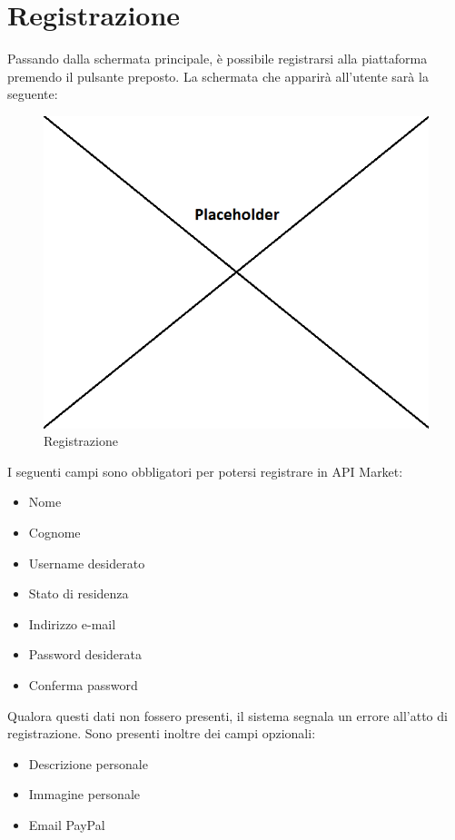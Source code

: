 \newpage
\section{Registrazione}

Passando dalla schermata principale, è possibile registrarsi alla piattaforma premendo il pulsante preposto. La schermata che apparirà all'utente sarà la seguente:

\label{Registrazione}
\begin{figure}[H]
	\centering
	\includegraphics[scale=0.45]{img/registrazione.png}
	\caption{Registrazione}
\end{figure}

I seguenti campi sono obbligatori per potersi registrare in API Market:
\begin{itemize}
	\item Nome
	\item Cognome
	\item Username desiderato
	\item Stato di residenza
	\item Indirizzo e-mail
	\item Password desiderata
	\item Conferma password
\end{itemize}

Qualora questi dati non fossero presenti, il sistema segnala un errore all'atto di registrazione. Sono presenti inoltre dei campi opzionali:

\begin{itemize}
	\item Descrizione personale
	\item Immagine personale
	\item Email PayPal
\end{itemize}

